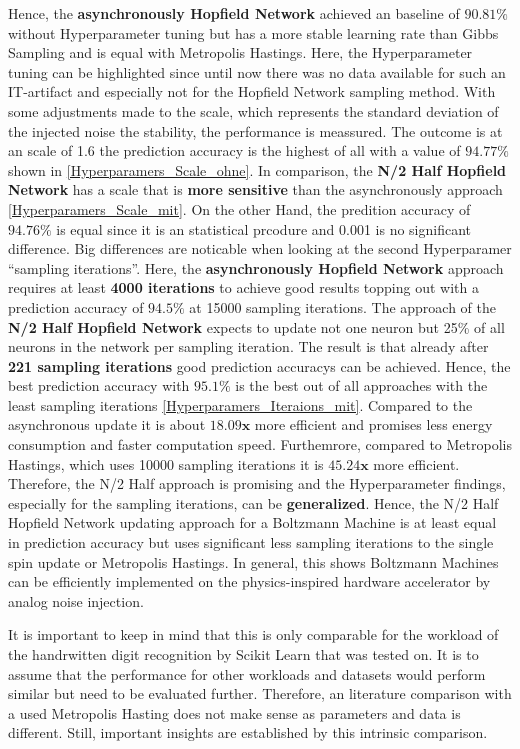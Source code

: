 Hence, the \textbf{asynchronously Hopfield Network} achieved an baseline of \(\mathbf{90.81\%}\) without Hyperparameter tuning but has a more stable  learning rate than Gibbs Sampling and
is equal with Metropolis Hastings.
Here, the Hyperparameter tuning can be highlighted since until now there was no data available for such an \ac{IT}-artifact and especially not for the Hopfield Network sampling method.
With some adjustments made to the scale, which represents the standard deviation of the injected noise the stability, the performance is meassured.
The outcome is at an scale of 1.6 the prediction accuracy is the highest of all with a value of \(\mathbf{94.77\%}\) shown in \ref{Hyperparamers_Scale_ohne}.
In comparison, the \textbf{N/2 Half Hopfield Network} has a scale that is \textbf{ more sensitive} than the asynchronously approach \ref{Hyperparamers_Scale_mit}.
On the other Hand, the predition accuracy of \(\mathbf{94.76\%}\) is equal since it is an statistical prcodure and 0.001 is no significant difference.
Big differences are noticable when looking at the second Hyperparamer ``sampling iterations''. 
Here, the \textbf{asynchronously Hopfield Network} approach requires at least \textbf{4000 iterations} to achieve good results topping out with
a prediction accuracy of \(\mathbf{94.5\%}\) at 15000 sampling iterations. The approach of the
\textbf{N/2 Half Hopfield Network} expects to update not one neuron but 25\% of all neurons in the network per sampling iteration. 
The result is that already after \textbf{221 sampling iterations} good prediction accuracys can be achieved.
Hence, the best prediction accuracy with \(\mathbf{95.1\%}\) is the best out of all approaches with the least sampling iterations \ref{Hyperparamers_Iteraions_mit}.
Compared to the asynchronous update it is about \(\mathbf{18.09x}\) more efficient and promises less energy consumption and faster computation speed. 
Furthemrore, compared to Metropolis Hastings, which uses 10000 sampling iterations it is \(\mathbf{45.24x}\) more efficient.
Therefore, the N/2 Half approach is promising and the Hyperparameter findings, especially for the sampling iterations, can be \textbf{generalized}.
Hence, the N/2 Half Hopfield Network updating approach for a Boltzmann Machine is at least equal in prediction accuracy but uses significant less sampling iterations to the single spin update or Metropolis Hastings.
In general, this shows Boltzmann Machines can be efficiently implemented on the physics-inspired hardware accelerator by analog noise injection. 

It is important to keep in mind that this is only comparable for the workload of the handrwitten digit recognition by Scikit Learn that was tested on. 
It is to assume that the performance for other workloads and datasets would perform similar but need to be evaluated further. 
Therefore, an literature comparison with a used Metropolis Hasting does not make sense as parameters and data is different. 
Still, important insights are established by this intrinsic comparison. 

